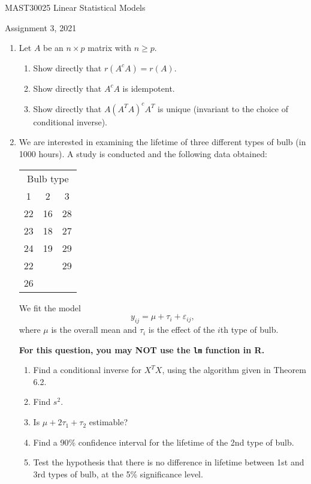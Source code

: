 \documentclass[a4paper]{article}
\newcommand{\e}{\varepsilon}
\newcommand{\0}{\mathbf{0}}
\begin{document}
\begin{centering}

\LARGE MAST30025 Linear Statistical Models

\vspace{0.5cm}

\Large Assignment 3, 2021

\end{centering}

\vspace{0.5cm}

\begin{enumerate}
	\item	Let $A$ be an $n \times p$ matrix with $n \geq p$.
	\begin{enumerate}
		\item Show directly that $r(A^c A) = r(A)$.
		\item Show directly that $A^c A$ is idempotent.
		\item Show directly that $A(A^TA)^c A^T$ is unique (invariant to the choice of conditional inverse).
	\end{enumerate}

\item We are interested in examining the lifetime of three different types of bulb (in 1000 hours). A study is conducted and the following data obtained:

\vspace{0.2cm}

\begin{tabular}{ccc}
\multicolumn{3}{c}{Bulb type} \\
1 & 2 & 3 \\
\hline
22 & 16 & 28 \\
23 & 18 & 27 \\
24 & 19 & 29 \\
22 &    & 29 \\
26
\end{tabular}

\vspace{0.2cm}

We fit the model
\[y_{ij} = \mu + \tau_i + \e_{ij},\]
where $\mu$ is the overall mean and $\tau_i$ is the effect of the $i$th type of bulb.

\vspace{0.2cm}

\textbf{For this question, you may NOT use the \texttt{lm} function in R.}

	\begin{enumerate}
	\item Find a conditional inverse for $X^TX$, using the algorithm given in Theorem 6.2.\label{condin}
	\item Find $s^2$.
	\item Is $\mu + 2\tau_1 + \tau_2$ estimable?
	\item Find a 90\% confidence interval for the lifetime of the 2nd type of bulb.
	\item Test the hypothesis that there is no difference in lifetime between 1st and 3rd types of bulb, at the 5\% significance level.
	\end{enumerate}




\end{enumerate}
\end{document}
